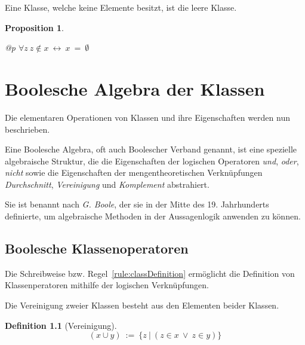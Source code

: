 \documentclass[a4paper,german,10pt,twoside]{book}
\newtheorem{prop}[thm]{Proposition}
\theoremstyle{definition}
\newtheorem{defn}[thm]{Definition}
\theoremstyle{remark}
\begin{document}
\par
Eine Klasse, welche keine Elemente besitzt, ist die leere Klasse.

\begin{prop}
\label{theorem:noClassIsMemberIsEmptySet} \hypertarget{theorem:noClassIsMemberIsEmptySet}{}
\mbox{}
\begin{longtable}{{@{\extracolsep{\fill}}p{\linewidth}}}
\centering $\forall z\ z \notin x\ \leftrightarrow \ x \ =  \ \emptyset$
\end{longtable}

\end{prop}






\chapter{Boolesche Algebra der Klassen} \label{chapter3} \hypertarget{chapter3}{}

Die elementaren Operationen von Klassen und ihre Eigenschaften werden nun beschrieben.

Eine Boolesche Algebra, oft auch Boolescher Verband genannt, ist eine spezielle algebraische
Struktur, die die Eigenschaften der logischen Operatoren \emph{und}, \emph{oder}, \emph{nicht}
sowie die Eigenschaften der mengentheoretischen Verkn{\"u}pfungen \emph{Durchschnitt},
\emph{Vereinigung} und \emph{Komplement} abstrahiert.

\par
Sie ist benannt nach \emph{G. Boole}, der sie in der Mitte des 19. Jahrhunderts definierte, um
algebraische Methoden in der Aussagenlogik anwenden zu k{\"o}nnen.

\section{Boolesche Klassenoperatoren} \label{chapter3_section0} \hypertarget{chapter3_section0}{}
Die Schreibweise bzw. Regel~\ref{rule:classDefinition} erm{\"o}glicht die Definition von Klassenperatoren mithilfe
der logischen Verkn{\"u}pfungen.

\par
Die Vereinigung zweier Klassen besteht aus den Elementen beider Klassen.

\begin{defn}[Vereinigung]
\label{definition:union} \hypertarget{definition:union}{}
$$(x \cup y)\ := \ \{ z \ | \ (z \in x\ \lor \ z \in y) \} $$

\end{defn}
\end{document}
